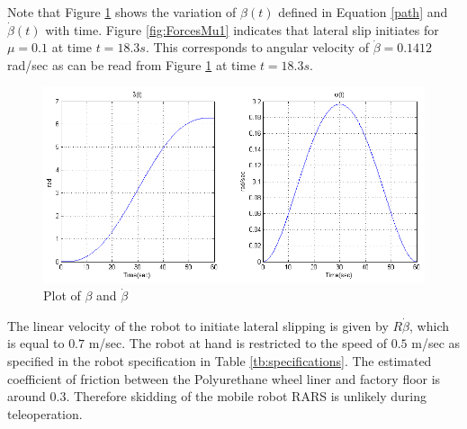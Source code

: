 Note that Figure \ref{fig:beta1} shows the variation of $\beta(t)$ defined in Equation \ref{path} and $\dot\beta(t)$ with time.  Figure \ref{fig:ForcesMu1} indicates  that lateral slip initiates for $\mu=0.1$ at time $t=18.3s$. This corresponds to angular velocity of $ \dot \beta =0.1412 $ rad/sec as can be read from Figure \ref{fig:beta1} at time $t=18.3s$.
\begin{figure}
	\centering
	\includegraphics[width=\linewidth]{Chapter4/fig/beta}
	\caption{Plot of $\beta$ and $\dot{\beta}$}
	\label{fig:beta1}
\end{figure}
The linear velocity of the robot to initiate lateral slipping is given by $R\dot{\beta}$, which is equal to $0.7$  m/sec. The robot at hand is restricted to the speed of $0.5$ m/sec as specified in the robot specification in Table \ref{tb:specifications}. The estimated coefficient of friction between the Polyurethane wheel liner and factory floor is around $0.3$. Therefore skidding of the mobile robot RARS is unlikely during teleoperation. 
